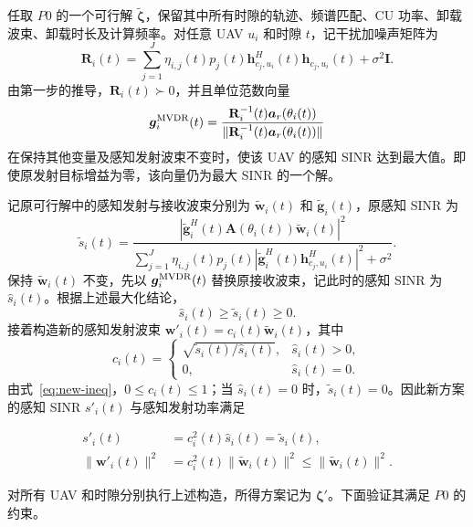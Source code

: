 \documentclass[11pt,a4paper]{ctexart}
\begin{document}
任取 $P0$ 的一个可行解 $\tilde{\bm\zeta}$，保留其中所有时隙的轨迹、频谱匹配、CU 功率、卸载波束、卸载时长及计算频率。对任意 UAV $u_i$ 和时隙 $t$，记干扰加噪声矩阵为
\begin{equation}\label{eq:new-cov}
\mathbf R_i(t)=\sum_{j=1}^{J}\eta_{i,j}(t)p_j(t)\bm h_{c_j,u_i}^{H}(t)\bm h_{c_j,u_i}(t)+\sigma^2\mathbf I.
\end{equation}
由第一步的推导，$\mathbf R_i(t)\succ0$，并且单位范数向量
\begin{equation}\label{eq:new-mvdr}
\bm g_i^{\rm MVDR}(t)=\frac{\mathbf R_i^{-1}(t)\bm a_r(\theta_i(t))}{\|\mathbf R_i^{-1}(t)\bm a_r(\theta_i(t))\|}
\end{equation}
在保持其他变量及感知发射波束不变时，使该 UAV 的感知 SINR 达到最大值。即使原发射目标增益为零，该向量仍为最大 SINR 的一个解。

记原可行解中的感知发射与接收波束分别为 $\tilde{\bm w}_i(t)$ 和 $\tilde{\bm g}_i(t)$，原感知 SINR 为
\begin{equation}\label{eq:new-old-sinr}
\tilde s_i(t)=\frac{\left|\tilde{\bm g}_i^H(t)\mathbf A(\theta_i(t))\tilde{\bm w}_i(t)\right|^2}{\displaystyle\sum_{j=1}^{J}\eta_{i,j}(t)p_j(t)\left|\tilde{\bm g}_i^H(t)\bm h_{c_j,u_i}^{H}(t)\right|^2+\sigma^2}.
\end{equation}
保持 $\tilde{\bm w}_i(t)$ 不变，先以 $\bm g_i^{\rm MVDR}(t)$ 替换原接收波束，记此时的感知 SINR 为 $\hat s_i(t)$。根据上述最大化结论，
\begin{equation}\label{eq:new-ineq}
\hat s_i(t)\ge\tilde s_i(t)\ge0.
\end{equation}
接着构造新的感知发射波束 $\bm w'_i(t)=c_i(t)\tilde{\bm w}_i(t)$，其中
\begin{equation}\label{eq:new-scale}
c_i(t)=\begin{cases}
\sqrt{\tilde s_i(t)/\hat s_i(t)},&\hat s_i(t)>0,\\
0,&\hat s_i(t)=0.
\end{cases}
\end{equation}
由式~\eqref{eq:new-ineq}，$0\le c_i(t)\le1$；当 $\hat s_i(t)=0$ 时，$\tilde s_i(t)=0$。因此新方案的感知 SINR $s'_i(t)$ 与感知发射功率满足
\begin{samepage}
\begin{align}\label{eq:new-same-sinr}
s'_i(t)&=c_i^2(t)\hat s_i(t)=\tilde s_i(t),\\
\|\bm w'_i(t)\|^2&=c_i^2(t)\|\tilde{\bm w}_i(t)\|^2\le\|\tilde{\bm w}_i(t)\|^2.\label{eq:new-power}
\end{align}
\end{samepage}
对所有 UAV 和时隙分别执行上述构造，所得方案记为 $\bm\zeta'$。下面验证其满足 $P0$ 的约束。
\end{document}
